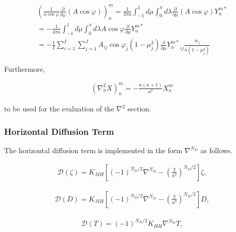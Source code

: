 \begin{eqnarray}
  \left( \frac{1}{a\cos\varphi}
         \frac{\partial{}}{\partial {\varphi}} (A\cos\varphi) \right)_n^m
    =  \frac{1}{4 \pi a}
         \int_{-1}^{1} d \mu \int_{0}^{\pi} d \lambda
           \frac{\partial{}}{\partial {\mu}} (A\cos\varphi) Y_n^{m *}  \\
    =  - \frac{1}{4 \pi a}
         \int_{-1}^{1} d \mu \int_{0}^{\pi} d \lambda
           A \cos\varphi \frac{\partial }{\partial \mu} Y_n^{m *}
            \\
   =  - \frac{1}{I} \sum_{i=1}^{I} \sum_{j=1}^{J}  
          A_{ij}  \cos\varphi_j
          (1-\mu_j^2)  \frac{\partial }{\partial \mu}
          {Y_n^{m *}}_{ij} \frac{w_j}{a(1-\mu_j^{2})}
\end{eqnarray}

Furthermore,

\begin{eqnarray}
     \left( \nabla^{2}_{\sigma} X \right)_n^m
       =  - \frac{n(n+1)}{a^{2}} X_n^m
\end{eqnarray}

to be used for the evaluation of the \(\nabla^2\) section.

\hypertarget{horizontal-diffusion-term}{%
\subsubsection{Horizontal Diffusion
Term}\label{horizontal-diffusion-term}}

The horizontal diffusion term is implemented in the form
\(\nabla^{N_D}\) as follows.

\begin{eqnarray}
  {\mathcal D}(\zeta) = K_{MH}
                      \left[ (-1)^{N_D/2} \nabla^{N_D}
                              - \left( \frac{2}{a^2} \right)^{N_D/2}
                      \right]
                    \zeta ,
\end{eqnarray}

\begin{eqnarray}
     {\mathcal D}(D) = K_{MH}
                      \left[ (-1)^{N_D/2} \nabla^{N_D}
                              - \left( \frac{2}{a^2} \right)^{N_D/2}
                      \right]
                    D ,
\end{eqnarray}

\begin{eqnarray}
    {\mathcal D}(T) = (-1)^{N_D/2} K_{HH} \nabla^{N_D} T ,
\end{eqnarray}

